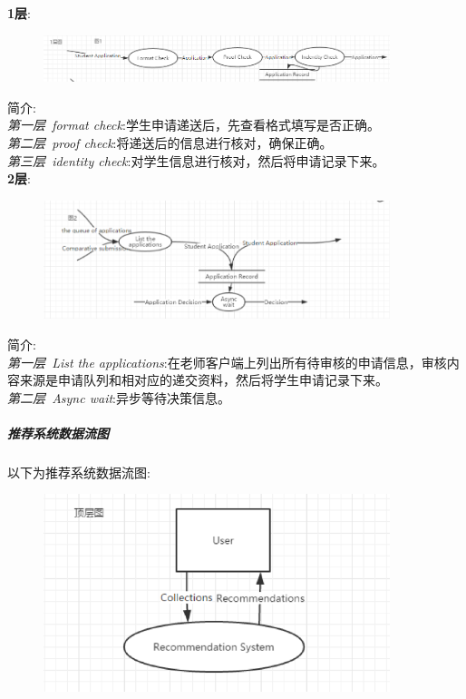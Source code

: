 \documentclass[UTF8]{ctexart}
\begin{document}
\textbf{1层}:\\
\begin{figure}[H]
\centering
\includegraphics[width = 0.9\textwidth]{download1-df.png}
\end{figure}
简介:\\
\emph{第一层~format check}:学生申请递送后，先查看格式填写是否正确。\\
\emph{第二层~proof check}:将递送后的信息进行核对，确保正确。\\
\emph{第三层~identity check}:对学生信息进行核对，然后将申请记录下来。\\

\textbf{2层}:\\
\begin{figure}[H]
\centering
\includegraphics[width = 0.9\textwidth]{download2-df.png}
\end{figure}
简介:\\
\emph{第一层~List the applications}:在老师客户端上列出所有待审核的申请信息，审核内容来源是申请队列和相对应的递交资料，然后将学生申请记录下来。
\\
\emph{第二层~Async wait}:异步等待决策信息。\\

\subparagraph*{推荐系统数据流图}
以下为推荐系统数据流图:\\
\begin{figure}[H]
\centering
\includegraphics[width = 0.9\textwidth]{recommend-df.png}
\end{figure}
\end{document}
